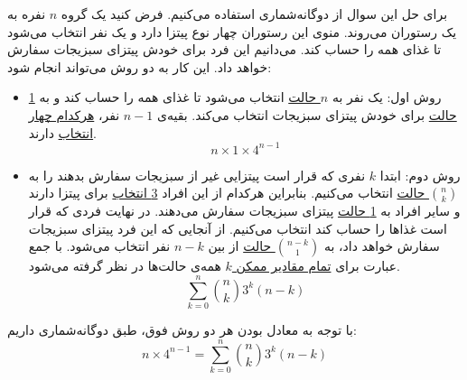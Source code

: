 \p
برای حل این سوال از دوگانه‌شماری استفاده می‌کنیم.
فرض کنید یک گروه 
$n$ 
نفره به یک رستوران می‌روند. منوی این رستوران چهار نوع پیتزا دارد و یک نفر انتخاب می‌شود تا غذای همه را حساب کند.
می‌دانیم این فرد برای خودش پیتزای سبزیجات سفارش خواهد داد.
 این کار به دو روش می‌تواند انجام شود:
\begin{itemize}
\item 
روش اول: 
یک نفر به 
\underline{$n$ حالت}
انتخاب می‌شود تا غذای همه را حساب کند
و به 
\underline{1 حالت}
برای خودش پیتزای سبزیجات انتخاب می‌کند.  
بقیه‌ی 
$n-1$ 
نفر، 
\underline{هرکدام چهار انتخاب}
 دارند. 
$$n\times 1 \times 4^{n-1}$$

\item 
روش دوم:
ابتدا $k$ 
نفری که قرار است پیتزایی غیر از سبزیجات سفارش بدهند را به
\underline{$\binom{n}{k}$ حالت}
انتخاب می‌کنیم. 
 بنابراین هرکدام از این افراد
 \underline{3 انتخاب}
   برای پیتزا دارند و
سایر افراد به
\underline{1 حالت}
  پیتزای سبزیجات سفارش می‌دهند.
در نهایت فردی که قرار است غذاها را حساب کند انتخاب می‌کنیم.
 از آنجایی که این فرد پیتزای سبزیجات سفارش خواهد داد، به
 \underline{$\binom{n-k}{1}$ حالت}
 از بین 
 $n-k$ 
 نفر انتخاب می‌شود. با جمع عبارت برای
 \underline{تمام مقادیر ممکن 
 $k$}
همه‌ی حالت‌ها در نظر گرفته می‌شود.
$$\sum\limits_{k=0}^{n} \binom{n}{k}3^k (n-k)$$
\end{itemize}

با ‌توجه به معادل بودن هر دو روش فوق، طبق دوگانه‌شماری داریم:
$$ n\times 4^{n-1} = \sum\limits_{k=0}^{n} \binom{n}{k}3^k (n-k) $$
